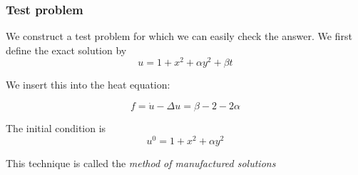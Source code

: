 \begin{frame}
  \frametitle{Test problem}

  We construct a test problem for which we can easily check the
  answer. We first define the exact solution by
  \begin{equation*}
    u = 1 + x^2 + \alpha y^2 + \beta t
  \end{equation*}

  \bigskip

  We insert this into the heat equation:

  \begin{equation*}
     f = \dot{u} - \Delta u = \beta - 2 - 2\alpha
  \end{equation*}

  \bigskip

  The initial condition is
  \begin{equation*}
    u^0 = 1 + x^2 + \alpha y^2
  \end{equation*}

  \bigskip

  This technique is called the \emph{method of manufactured solutions}

\end{frame}
